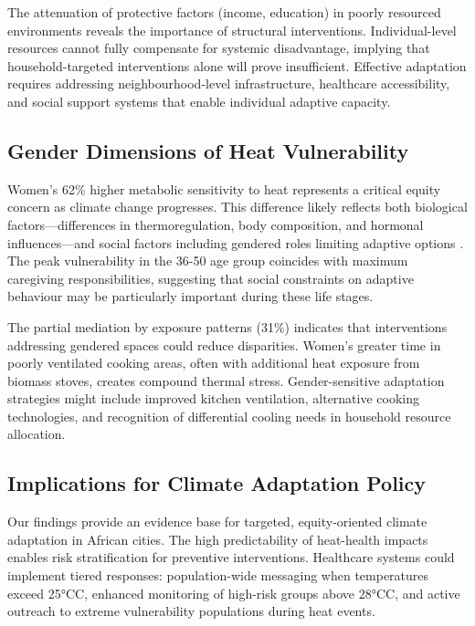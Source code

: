 \documentclass[11pt,a4paper]{article}
\newcommand{\degrees}{°C}
\begin{document}
The attenuation of protective factors (income, education) in poorly resourced environments reveals the importance of structural interventions. Individual-level resources cannot fully compensate for systemic disadvantage, implying that household-targeted interventions alone will prove insufficient. Effective adaptation requires addressing neighbourhood-level infrastructure, healthcare accessibility, and social support systems that enable individual adaptive capacity.

\subsection{Gender Dimensions of Heat Vulnerability}

Women's 62\% higher metabolic sensitivity to heat represents a critical equity concern as climate change progresses. This difference likely reflects both biological factors—differences in thermoregulation, body composition, and hormonal influences—and social factors including gendered roles limiting adaptive options \citep{Gagnon2013, Charkoudian2017}. The peak vulnerability in the 36-50 age group coincides with maximum caregiving responsibilities, suggesting that social constraints on adaptive behaviour may be particularly important during these life stages.

The partial mediation by exposure patterns (31\%) indicates that interventions addressing gendered spaces could reduce disparities. Women's greater time in poorly ventilated cooking areas, often with additional heat exposure from biomass stoves, creates compound thermal stress. Gender-sensitive adaptation strategies might include improved kitchen ventilation, alternative cooking technologies, and recognition of differential cooling needs in household resource allocation.

\subsection{Implications for Climate Adaptation Policy}

Our findings provide an evidence base for targeted, equity-oriented climate adaptation in African cities. The high predictability of heat-health impacts enables risk stratification for preventive interventions. Healthcare systems could implement tiered responses: population-wide messaging when temperatures exceed 25\degrees C, enhanced monitoring of high-risk groups above 28\degrees C, and active outreach to extreme vulnerability populations during heat events.
\end{document}
